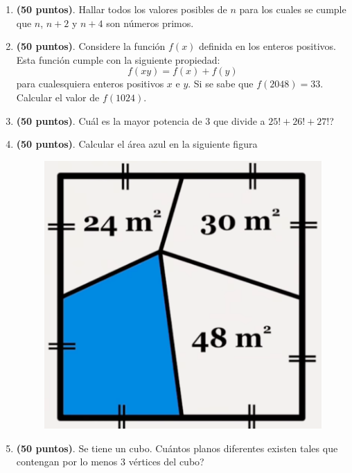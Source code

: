 \begin{enumerate}
	\item \textbf{(50 puntos)}. Hallar todos los valores posibles de $n$ para los cuales se cumple que $n$, $n+2$ y $n+4$ son números primos.
	

	\item \textbf{(50 puntos)}. Considere la función $f(x)$ definida en los enteros positivos. Esta función cumple con la siguiente propiedad:
	\[
	f(xy)=f(x) + f(y)
	\]	
	para cualesquiera enteros positivos $x$ e $y$. Si se sabe que $f(2048)=33$. Calcular el valor de $f(1024)$.
	
	\item \textbf{(50 puntos)}. Cuál es la mayor potencia de $3$ que divide a $25!+26!+27!$?

	\item \textbf{(50 puntos)}. Calcular el área azul en la siguiente figura
	\begin{figure}[H]
		\centering
		\includegraphics[width=0.4\linewidth]{2020_09_12/imgs/geometria}
		\label{fig:geometria}
	\end{figure}


	\item \textbf{(50 puntos)}. Se tiene un cubo. Cuántos planos diferentes existen tales que contengan por lo menos 3 vértices del cubo?

\end{enumerate}